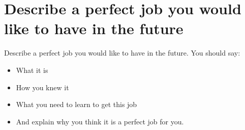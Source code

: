 \newpage

\section{Describe a perfect job you would like to have in the future}
\begin{ieltsprompt}
Describe a perfect job you would like to have in the future.
You should say:
\begin{itemize}[leftmargin=2em, itemsep=2pt]
\item What it is
\item How you knew it
\item What you need to learn to get this job
\item And explain why you think it is a perfect job for you.
\end{itemize}
\end{ieltsprompt}
